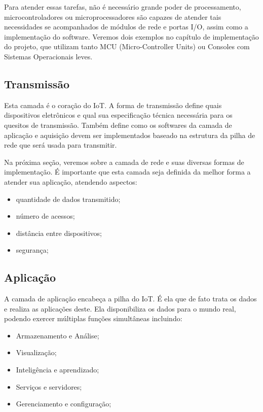 Para atender essas tarefas, não é necessário grande poder de processamento, microcontroladores ou microprocessadores são capazes de atender tais necessidades se acompanhados de módulos de rede e portas I/O, assim como a implementação do software. Veremos dois exemplos no capítulo de implementação do projeto, que utilizam tanto MCU (Micro-Controller Units) ou Consoles com Sistemas Operacionais leves.
 

\subsection{Transmissão}
\label{subsection:transmicao}

Esta camada é o coração do IoT. A forma de transmissão define quais dispositivos eletrônicos e qual sua especificação técnica necessária para os quesitos de transmissão. Também define como os softwares da camada de aplicação e aquisição devem ser implementados baseado na estrutura da pilha de rede que será usada para transmitir.

Na próxima seção, veremos sobre a camada de rede e suas diversas formas de implementação. É importante que esta camada seja definida da melhor forma a atender sua aplicação, atendendo aspectos: 
\begin{itemize}
\item quantidade de dados transmitido;
\item número de acessos; 
\item distância entre dispositivos;
\item segurança;
\end{itemize}

\subsection{Aplicação}
\label{subsection:aplicacao}

A camada de aplicação encabeça a pilha do IoT. É ela que de fato trata os dados e realiza as aplicações deste. Ela disponibiliza os dados para o mundo real, podendo exercer múltiplas funções simultâneas incluindo:

\begin{itemize}
\item Armazenamento e Análise;
\item Visualização; 
\item Inteligência e aprendizado;
\item Serviços e servidores;
\item Gerenciamento e configuração;
\end{itemize}

